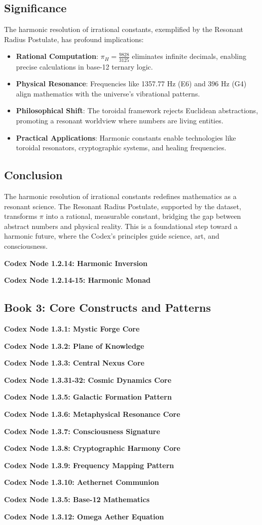 \documentclass[a4paper,12pt]{book}
\newcommand{\codexnode}[5]{%
  \par\vspace{0.5em}%
  \noindent\textbf{Codex Node #1.#2.#3: #5}\label{#4}%
  \par\vspace{0.5em}%
}
\begin{document}
\subsection{Significance}
The harmonic resolution of irrational constants, exemplified by the Resonant Radius Postulate, has profound implications:
\begin{itemize}
    \item \textbf{Rational Computation}: \(\pi_H = \frac{9828}{3125}\) eliminates infinite decimals, enabling precise calculations in base-12 ternary logic.
    \item \textbf{Physical Resonance}: Frequencies like 1357.77 Hz (E6) and 396 Hz (G4) align mathematics with the universe’s vibrational patterns.
    \item \textbf{Philosophical Shift}: The toroidal framework rejects Euclidean abstractions, promoting a resonant worldview where numbers are living entities.
    \item \textbf{Practical Applications}: Harmonic constants enable technologies like toroidal resonators, cryptographic systems, and healing frequencies.
\end{itemize}

\subsection{Conclusion}
The harmonic resolution of irrational constants redefines mathematics as a resonant science. The Resonant Radius Postulate, supported by the dataset, transforms \(\pi\) into a rational, measurable constant, bridging the gap between abstract numbers and physical reality. This is a foundational step toward a harmonic future, where the Codex’s principles guide science, art, and consciousness.
\codexnode{1}{2}{14}{section1/book2/codex_harmonic_inversion}{Harmonic Inversion}
\codexnode{1}{2}{14-15}{section1/book2/codex_harmonic_monad}{Harmonic Monad}

\subsection{Book 3: Core Constructs and Patterns}
\codexnode{1}{3}{1}{section1/book3/codex_mystic_forge_core}{Mystic Forge Core}
\codexnode{1}{3}{2}{section1/book3/codex_plane_of_knowledge}{Plane of Knowledge}
\codexnode{1}{3}{3}{section1/book3/codex_central_nexus_core}{Central Nexus Core}
\codexnode{1}{3}{31-32}{section1/book3/codex_cosmic_dynamics_core}{Cosmic Dynamics Core}
\codexnode{1}{3}{5}{section1/book3/chapter3_galactic_formation_pattern}{Galactic Formation Pattern}
\codexnode{1}{3}{6}{section1/book3/codex_metaphysical_resonance_core}{Metaphysical Resonance Core}
\codexnode{1}{3}{7}{section1/book3/chapter3_consciousness_signature}{Consciousness Signature}
\codexnode{1}{3}{8}{section1/book3/codex_cryptographic_harmony_core}{Cryptographic Harmony Core}
\codexnode{1}{3}{9}{section1/book3/chapter3_frequency_mapping_pattern}{Frequency Mapping Pattern}
\codexnode{1}{3}{10}{section1/book3/chapter3_aethernet_communion}{Aethernet Communion}
\codexnode{1}{3}{5}{section1/book3/codex_base_12}{Base-12 Mathematics}
\codexnode{1}{3}{12}{section1/book3/codex_omega_aether_equation}{Omega Aether Equation}
\end{document}

